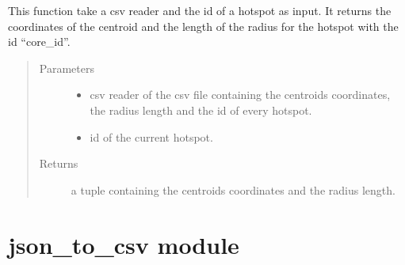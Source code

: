 \documentclass[letterpaper,10pt,english]{sphinxmanual}
\begin{document}

\begin{fulllineitems}
\label{\detokenize{json_csv_to_xml:json_csv_to_xml.derivation}}
\sphinxAtStartPar
This function take a csv reader and the id of a hotspot as input. It returns the coordinates of the centroid and
the length of the radius for the hotspot with the id “core\_id”.
\begin{quote}\begin{description}
\item[{Parameters}] \leavevmode\begin{itemize}
\item {} 
\sphinxAtStartPar
{} \textendash{} csv reader of the csv file containing the centroids coordinates, the radius length and the id of every hotspot.

\item {} 
\sphinxAtStartPar
{} \textendash{} id of the current hotspot.

\end{itemize}

\item[{Returns}] \leavevmode
\sphinxAtStartPar
a tuple containing the centroids coordinates and the radius length.

\end{description}\end{quote}

\end{fulllineitems}



\section{json\_to\_csv module}
\label{\detokenize{json_to_csv:module-json_to_csv}}\label{\detokenize{json_to_csv:json-to-csv-module}}\label{\detokenize{json_to_csv::doc}}
\end{document}

